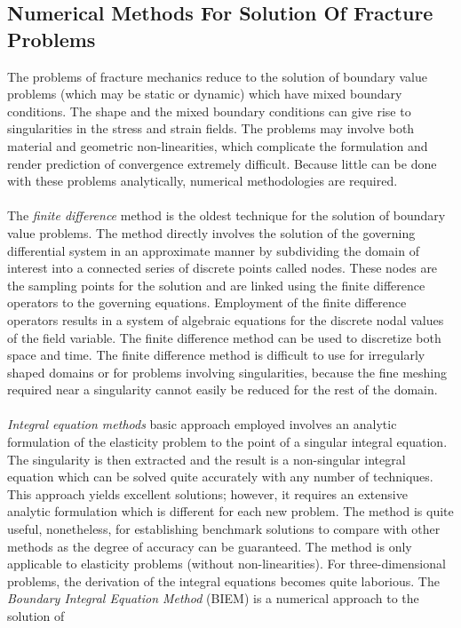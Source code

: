 \documentclass[12pt]{article}
\begin{document}
\subsection{Numerical Methods For Solution Of Fracture Problems}
The problems of fracture mechanics reduce to the solution of boundary value problems (which may
be static or dynamic) which have mixed boundary conditions. The shape and the mixed boundary
conditions can give rise to singularities in the stress and strain fields. The problems may involve
both material and geometric non-linearities, which complicate the formulation and render
prediction of convergence extremely difficult. Because little can be done with these problems
analytically, numerical methodologies are required.
\\\\
The \textit{finite difference} method is the oldest technique for the solution of boundary value
problems. The method directly involves the solution of the
governing differential system in an approximate manner by subdividing the domain of interest into
a connected series of discrete points called nodes. These nodes are the sampling points for the
solution and are linked using the finite difference operators to the governing equations. Employment 
of the finite difference operators results in a system of algebraic equations for the discrete
nodal values of the field variable. The finite difference method can be used to discretize both space
and time. The finite difference method is difficult to use for irregularly shaped domains or for problems involving
singularities, because the fine meshing required near a singularity cannot easily be reduced for the
rest of the domain. 
\\\\
\textit{Integral equation methods} basic approach employed involves an analytic formulation
of the elasticity problem to the point of a singular integral equation. The singularity is then
extracted and the result is a non-singular integral equation which can be solved quite accurately
with any number of techniques. This approach yields excellent solutions; however, it requires an
extensive analytic formulation which is different for each new problem. The method is quite useful,
nonetheless, for establishing benchmark solutions to compare with other methods as the degree
of accuracy can be guaranteed. The method is only applicable to elasticity problems (without
non-linearities). For three-dimensional problems, the derivation of the integral equations becomes
quite laborious.
The \textit{Boundary Integral Equation  Method} (BIEM) is a numerical approach to the solution of
\end{document}
